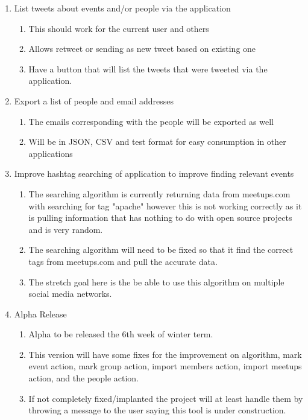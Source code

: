 \documentclass[draftclsnofoot,10pt,onecolumn]{IEEEtran} %
\begin{document}
\begin{enumerate}
\item List tweets about events and/or people via the application \\
\begin{enumerate}
\item This should work for the current user and others
\item Allows retweet or sending as new tweet based on existing one
\item Have a button that will list the tweets that were tweeted via the application. \\
\end{enumerate}

\item Export a list of people and email addresses \\
\begin{enumerate}
\item The emails corresponding with the people will be exported as well
\item Will be in JSON, CSV and test format for easy consumption in other applications \\
\end{enumerate}

\item Improve hashtag searching of application to improve finding relevant events \\
\begin{enumerate}
\item The searching algorithm is currently returning data from meetups.com with searching for tag "apache" however this is not working correctly as it is pulling information that has nothing to do with open source projects and is very random.
\item The searching algorithm will need to be fixed so that it find the correct tags from meetups.com and pull the accurate data.
\item The stretch goal here is the be able to use this algorithm on multiple social media networks. \\
\end{enumerate}

\item Alpha Release \\
\begin{enumerate}
\item Alpha to be released the 6th week of winter term.
\item This version will have some fixes for the improvement on algorithm, mark event action, mark group action, import members action, import meetups action, and the people action.
\item If not completely fixed/implanted the project will at least handle them by throwing a message to the user saying this tool is under construction. \\
\end{enumerate}


\end{enumerate}
\end{document}
